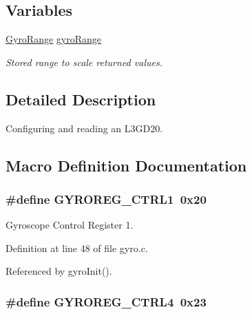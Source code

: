 \subsection*{Variables}
\begin{DoxyCompactItemize}
\item 
\hyperlink{group__gyro_ga12b0e0572fdceaa90874f9364c862ead}{Gyro\-Range} \hyperlink{group__gyro_gaa2ed27a7e4a0d8a5f492ef6059a04615}{gyro\-Range}
\begin{DoxyCompactList}\small\item\em Stored range to scale returned values. \end{DoxyCompactList}\end{DoxyCompactItemize}


\subsection{Detailed Description}
Configuring and reading an L3\-G\-D20. 

\subsection{Macro Definition Documentation}
\hypertarget{group__gyro_ga59d5eec860eab49733b4a814731e356c}{
\subsubsection[{G\-Y\-R\-O\-R\-E\-G\-\_\-\-C\-T\-R\-L1}]{\setlength{\rightskip}{0pt plus 5cm}\#define G\-Y\-R\-O\-R\-E\-G\-\_\-\-C\-T\-R\-L1~0x20}}\label{group__gyro_ga59d5eec860eab49733b4a814731e356c}


Gyroscope Control Register 1. 



Definition at line 48 of file gyro.\-c.



Referenced by gyro\-Init().

\hypertarget{group__gyro_gae9b6f4aab3818fdb4c99970918e0a705}{
\subsubsection[{G\-Y\-R\-O\-R\-E\-G\-\_\-\-C\-T\-R\-L4}]{\setlength{\rightskip}{0pt plus 5cm}\#define G\-Y\-R\-O\-R\-E\-G\-\_\-\-C\-T\-R\-L4~0x23}}\label{group__gyro_gae9b6f4aab3818fdb4c99970918e0a705}


